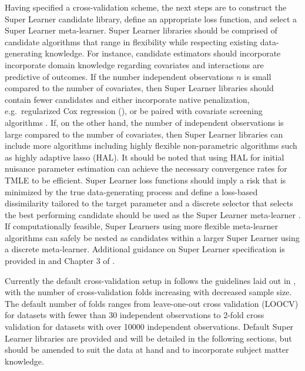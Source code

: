 Having specified a cross-validation scheme, the next steps are to construct the Super Learner candidate library, define an appropriate loss function, and select a Super Learner meta-learner. Super Learner libraries should be comprised of candidate algorithms that range in flexibility while respecting existing data-generating knowledge. For instance, candidate estimators should incorporate incorporate domain knowledge regarding covariates and interactions are predictive of outcomes. If the number independent observations \(n\) is small compared to the number of covariates, then Super Learner libraries should contain fewer candidates and either incorporate native penalization, e.g.~regularized Cox regression (), or be paired with covariate screening algorithms \citep{phillips_practical_2022}. If, on the other hand, the number of independent observations is large compared to the number of covariates, then Super Learner libraries can include more algorithms including highly flexible non-parametric algorithms such as highly adaptive lasso (HAL). It should be noted that using HAL for initial nuisance parameter estimation can achieve the necessary convergence rates \citep{laan_generally_2017, bibaut_fast_2019, rytgaard_estimation_2023} for TMLE to be efficient. Super Learner loss functions should imply a risk that is minimized by the true data-generating process and define a loss-based dissimilarity tailored to the target parameter and a discrete selector that selects the best performing candidate should be used as the Super Learner meta-learner \citep{laan_super_2007, phillips_practical_2022}. If computationally feasible, Super Learners using more flexible meta-learner algorithms can safely be nested as candidates within a larger Super Learner using a discrete meta-learner. Additional guidance on Super Learner specification is provided in \citep{phillips_practical_2022} and Chapter 3 of \citep{laan_targeted_2011}.

Currently the default cross-validation setup in  follows the guidelines laid out in \citep{phillips_practical_2022, dudoit_asymptotics_2005, vaart_oracle_2006}, with the number of cross-validation folds increasing with decreased sample size. The default number of folds ranges from leave-one-out cross validation (LOOCV) for datasets with fewer than 30 independent observations to 2-fold cross validation for datasets with over 10000 independent observations. Default Super Learner libraries are provided and will be detailed in the following sections, but should be amended to suit the data at hand and to incorporate subject matter knowledge.

